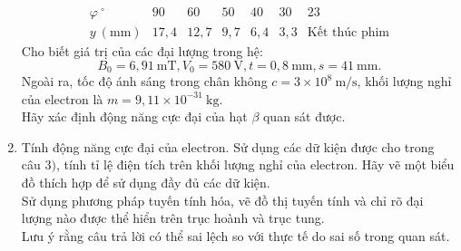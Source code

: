\begin{vd}
\begin{enumerate}[1)]
\[\begin{array}{ccccccc}
     \varphi ~^\circ & 90 & 60 & 50 & 40 & 30 & 23 \\
     y ~(\mathrm{mm})& 17,4 & 12,7 & 9,7 & 6,4 & 3,3 & \text{Kết thúc phim}
\end{array}\]
Cho biết giá trị của các đại lượng trong hệ:
\[B_0 = 6,91~\mathrm{mT}, V_0 = 580~\mathrm{V}, t = 0,8~\mathrm{mm}, s = 41 ~\mathrm{mm}.\]
Ngoài ra, tốc độ ánh sáng trong chân không $c = 3 \times 10^8 ~\mathrm{m/s}$, khối lượng nghỉ của electron là $m = 9,11 \times 10^{-31}~\mathrm{kg}$.\\
Hãy xác định động năng cực đại của hạt $\beta$ quan sát được.
\item Tính động năng cực đại của electron. Sử dụng các dữ kiện được cho trong câu $3)$, tính tỉ lệ điện tích trên khối lượng nghỉ của electron. Hãy vẽ một biểu đồ thích hợp để sử dụng đầy đủ các dữ kiện.\\
Sử dụng phương pháp tuyến tính hóa, vẽ đồ thị tuyến tính và chỉ rõ đại lượng nào được thể hiển trên trục hoành và trục tung.\\ 
Lưu ý rằng câu trả lời có thể sai lệch so với thực tế do sai số trong quan sát.
\end{enumerate}
\end{vd}
